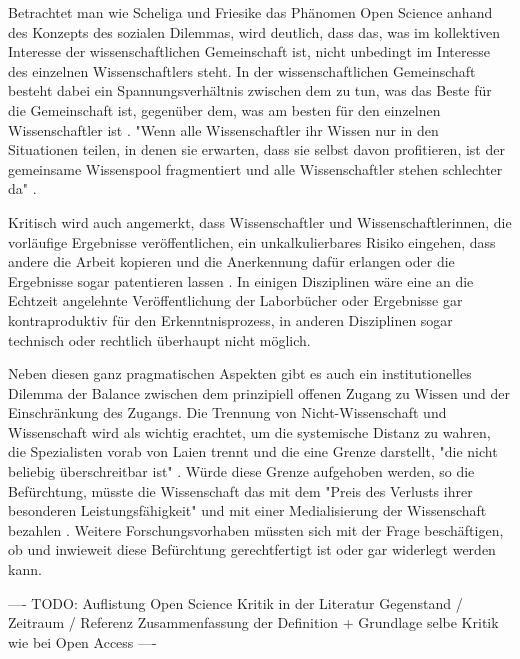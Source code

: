 Betrachtet man wie Scheliga und Friesike das Phänomen Open Science anhand des Konzepts des sozialen Dilemmas, wird deutlich, dass das, was im kollektiven Interesse der wissenschaftlichen Gemeinschaft ist, nicht unbedingt im Interesse des einzelnen Wissenschaftlers steht. In der wissenschaftlichen Gemeinschaft besteht dabei ein Spannungsverhältnis zwischen dem zu tun, was das Beste für die Gemeinschaft ist, gegenüber dem, was am besten für den einzelnen Wissenschaftler ist \cite{Ekins_2014} \cite{patlak_2010_open} \cite{wein_2010_erwerbung}. "Wenn alle Wissenschaftler ihr Wissen nur in den Situationen teilen, in denen sie erwarten, dass sie selbst davon profitieren, ist der gemeinsame Wissenspool fragmentiert und alle Wissenschaftler stehen schlechter da" \cite{Scheliga_2014}.

Kritisch wird auch angemerkt, dass Wissenschaftler und Wissenschaftlerinnen, die vorläufige Ergebnisse veröffentlichen, ein unkalkulierbares Risiko eingehen, dass andere die Arbeit kopieren und die Anerkennung dafür erlangen oder die Ergebnisse sogar patentieren lassen \cite{Peters_2014}. In einigen Disziplinen wäre eine an die Echtzeit angelehnte Veröffentlichung der Laborbücher oder Ergebnisse gar kontraproduktiv für den Erkenntnisprozess, in anderen Disziplinen sogar technisch oder rechtlich überhaupt nicht möglich.

Neben diesen ganz pragmatischen Aspekten gibt es auch ein institutionelles Dilemma der Balance zwischen dem prinzipiell offenen Zugang zu Wissen und der Einschränkung des Zugangs. Die Trennung von Nicht-Wissenschaft und Wissenschaft wird als wichtig erachtet, um die systemische Distanz zu wahren, die Spezialisten vorab von Laien trennt und die eine Grenze darstellt, "die nicht beliebig überschreitbar ist" \cite{weingart_2005_wissenschaft}. Würde diese Grenze aufgehoben werden, so die Befürchtung, müsste die Wissenschaft das mit dem "Preis des Verlusts ihrer besonderen Leistungsfähigkeit" und mit einer Medialisierung der Wissenschaft bezahlen \cite{weingart_2005_wissenschaft}. Weitere Forschungsvorhaben müssten sich mit der Frage beschäftigen, ob und inwieweit diese Befürchtung gerechtfertigt ist oder gar widerlegt werden kann.

---- TODO: Auflistung Open Science Kritik in der Literatur Gegenstand / Zeitraum / Referenz Zusammenfassung der Definition + Grundlage selbe Kritik wie bei Open Access ----

